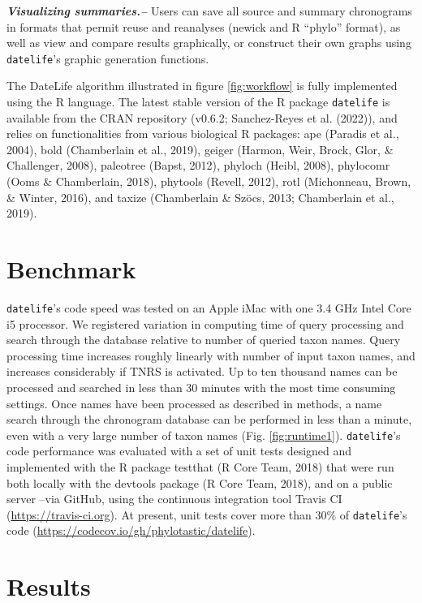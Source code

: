 \documentclass[
  english,
  man]{apa6}
\begin{document}
\emph{\textbf{Visualizing summaries.--}} Users can save all source and summary chronograms in formats that permit reuse and reanalyses (newick and R ``phylo'' format), as well as view and compare results graphically, or construct their own graphs using \texttt{datelife}'s graphic generation functions.

The DateLife algorithm illustrated in figure \ref{fig:workflow} is fully implemented using the R language. The latest stable version of the R package \texttt{datelife} is available from the CRAN repository (v0.6.2; Sanchez-Reyes et al. (2022)), and relies on functionalities from various biological R packages:
ape (Paradis et al., 2004),
bold (Chamberlain et al., 2019),
geiger (Harmon, Weir, Brock, Glor, \& Challenger, 2008),
paleotree (Bapst, 2012),
phyloch (Heibl, 2008),
phylocomr (Ooms \& Chamberlain, 2018),
phytools (Revell, 2012),
rotl (Michonneau, Brown, \& Winter, 2016), and
taxize (Chamberlain \& Szöcs, 2013; Chamberlain et al., 2019).

\hypertarget{benchmark}{%
\section{Benchmark}\label{benchmark}}

\texttt{datelife}'s code speed was tested on an Apple iMac
with one 3.4 GHz Intel Core i5 processor.
We registered variation in computing time of query processing and search through the database relative to number of queried taxon names.
Query processing time increases roughly linearly with number of input taxon names, and
increases considerably if TNRS is activated.
Up to ten thousand names can be processed and searched in less than 30 minutes with the most time consuming settings.
Once names have been processed as described in methods, a name search through the chronogram database can be performed in less than a minute, even with a very large number of taxon names (Fig. \ref{fig:runtime1}).
\texttt{datelife}'s code performance was evaluated with a set of unit tests designed and
implemented with the R package testthat (R Core Team, 2018) that were run both locally
with the devtools package (R Core Team, 2018), and on a public server --via
GitHub, using the continuous integration tool Travis CI (\url{https://travis-ci.org}). At
present, unit tests cover more than 30\% of \texttt{datelife}'s code (\url{https://codecov.io/gh/phylotastic/datelife}).

\hypertarget{results}{%
\section{Results}\label{results}}
\end{document}
